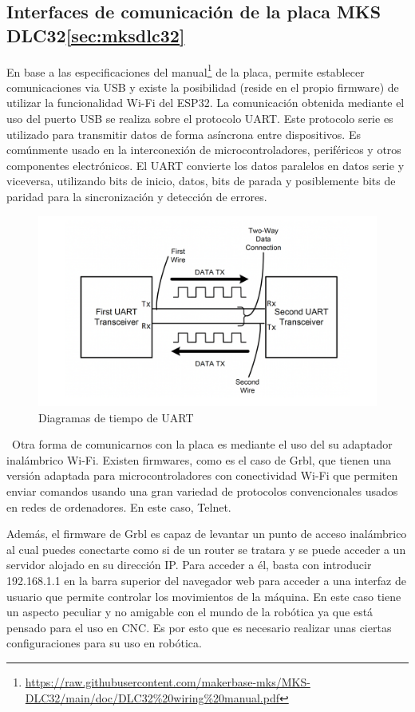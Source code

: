 \subsection{Interfaces de comunicación de la placa MKS DLC32\ref{sec:mksdlc32}}
En base a las especificaciones del manual\footnote{\url{https://raw.githubusercontent.com/makerbase-mks/MKS-DLC32/main/doc/DLC32\%20wiring\%20manual.pdf}} 
de la placa, permite establecer comunicaciones via USB y existe la posibilidad (reside en el propio firmware) de utilizar la funcionalidad 
Wi-Fi del ESP32. 
La comunicación obtenida mediante el uso del puerto USB se realiza sobre el protocolo \ac{UART}. Este protocolo serie es utilizado para 
transmitir datos de forma asíncrona entre dispositivos. Es comúnmente usado en la interconexión de microcontroladores, 
periféricos y otros componentes electrónicos. El UART convierte los datos paralelos en datos serie y viceversa, utilizando bits 
de inicio, datos, bits de parada y posiblemente bits de paridad para la sincronización y detección de errores. 
\begin{figure} [h!]
    \begin{center}
    \includegraphics[width=12cm]{figs/uart.png}
    \end{center}
    \caption{Diagramas de tiempo de UART}
    \label{fig:uart}
\end{figure}\ 
Otra forma de comunicarnos con la placa es mediante el uso del su adaptador inalámbrico Wi-Fi. Existen firmwares, como es el caso de 
Grbl, que tienen una versión adaptada para microcontroladores con conectividad Wi-Fi que permiten enviar comandos usando una gran 
variedad de protocolos convencionales usados en redes de ordenadores. En este caso, Telnet. 

Además, el firmware de Grbl es capaz de levantar un punto de acceso inalámbrico al cual puedes conectarte como si de un router 
se tratara y se puede acceder a un servidor alojado en su dirección IP. Para acceder a él, basta con introducir 192.168.1.1 en la 
barra superior del navegador web para acceder a una interfaz de usuario que permite controlar los movimientos de la máquina. En este 
caso tiene un aspecto peculiar y no amigable con el mundo de la robótica ya que está pensado para el uso en CNC. Es por esto que es 
necesario realizar unas ciertas configuraciones para su uso en robótica.


